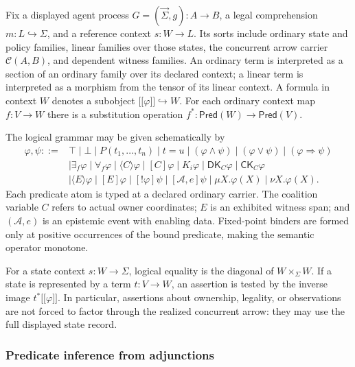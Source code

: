 \documentclass[11pt,a4paper]{article}
\numberwithin{equation}{section}
\theoremstyle{definition}
\theoremstyle{remark}
\theoremstyle{plain}
\providecommand{\llbracket}{\mathopen{[\![}}
\providecommand{\rrbracket}{\mathclose{]\!]}}
\begin{document}
Fix a displayed agent process $G=(\vec\Sigma,g):A\to B$, a legal
comprehension $m:L\hookrightarrow\Sigma$, and a reference context
$s:W\to L$.  Its sorts include ordinary state and policy families,
linear families over those states, the concurrent arrow carrier
$\mathcal C(A,B)$, and dependent witness families.  An ordinary term is
interpreted as a section of an ordinary family over its declared
context; a linear term is interpreted as a morphism from the tensor of
its linear context.  A formula in context $W$ denotes a subobject
$\llbracket\varphi\rrbracket\hookrightarrow W$.  For each ordinary
context map $f:V\to W$ there is a substitution operation
$f^*: \mathsf{Pred}(W)\to\mathsf{Pred}(V)$.

The logical grammar may be given schematically by
\[
\begin{aligned}
\varphi,\psi ::= {}&\top\mid\bot\mid P(t_1,\ldots,t_n)
 \mid t=u\mid(\varphi\wedge\psi)
 \mid(\varphi\vee\psi)\mid(\varphi\Rightarrow\psi)\\
 &\mid\exists_{f}\varphi\mid\forall_f\varphi
 \mid\langle C\rangle\varphi\mid[C]\varphi
 \mid K_i\varphi\mid\mathsf{DK}_C\varphi\mid\mathsf{CK}_C\varphi\\
 &\mid\langle E\rangle\varphi\mid[E]\varphi
 \mid[!\varphi]\psi\mid[\mathcal A,e]\psi
 \mid\mu X.\varphi(X)\mid\nu X.\varphi(X).
\end{aligned}
\]
Each predicate atom is typed at a declared ordinary carrier.
The coalition variable $C$ refers to actual owner coordinates; $E$
is an exhibited witness span; and $(\mathcal A,e)$ is an epistemic
event with enabling data. Fixed-point binders are formed only at
positive occurrences of the bound predicate, making the semantic
operator monotone.

For a state context $s:W\to\Sigma$, logical equality is the diagonal
of $W\times_\Sigma W$.  If a state is represented by a term
$t:V\to W$, an assertion is tested by the inverse image
$t^*\llbracket\varphi\rrbracket$.  In particular, assertions about
ownership, legality, or observations are not forced to factor through the
realized concurrent arrow: they may use the full displayed state record.

\subsubsection{Predicate inference from adjunctions}
\end{document}
